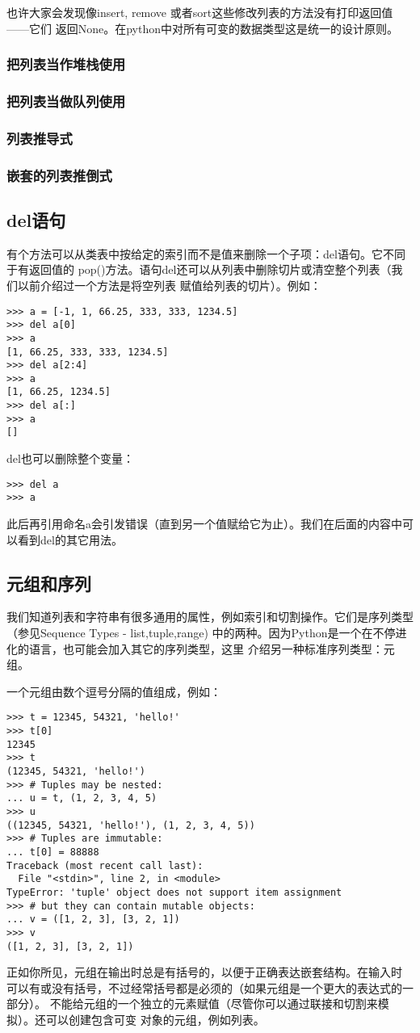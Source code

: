 \documentclass[UTF8]{ctexart}
\begin{document}
也许大家会发现像insert, remove 或者sort这些修改列表的方法没有打印返回值——它们
返回None。在python中对所有可变的数据类型这是统一的设计原则。
\subsubsection{把列表当作堆栈使用}
\subsubsection{把列表当做队列使用}
\subsubsection{列表推导式}
\subsubsection{嵌套的列表推倒式}
\subsection{del语句}
有个方法可以从类表中按给定的索引而不是值来删除一个子项：del语句。它不同于有返回值的
pop()方法。语句del还可以从列表中删除切片或清空整个列表（我们以前介绍过一个方法是将空列表
赋值给列表的切片）。例如：
\begin{verbatim}
>>> a = [-1, 1, 66.25, 333, 333, 1234.5]
>>> del a[0]
>>> a
[1, 66.25, 333, 333, 1234.5]
>>> del a[2:4]
>>> a
[1, 66.25, 1234.5]
>>> del a[:]
>>> a
[]
\end{verbatim}

del也可以删除整个变量：
\begin{verbatim}
>>> del a
>>> a
\end{verbatim}

此后再引用命名a会引发错误（直到另一个值赋给它为止）。我们在后面的内容中可以看到del的其它用法。
\subsection{元组和序列}
我们知道列表和字符串有很多通用的属性，例如索引和切割操作。它们是序列类型（参见Sequence Types -
list,tuple,range) 中的两种。因为Python是一个在不停进化的语言，也可能会加入其它的序列类型，这里
介绍另一种标准序列类型：元组。

一个元组由数个逗号分隔的值组成，例如：
\begin{verbatim}
>>> t = 12345, 54321, 'hello!'
>>> t[0]
12345
>>> t
(12345, 54321, 'hello!')
>>> # Tuples may be nested:
... u = t, (1, 2, 3, 4, 5)
>>> u
((12345, 54321, 'hello!'), (1, 2, 3, 4, 5))
>>> # Tuples are immutable:
... t[0] = 88888
Traceback (most recent call last):
  File "<stdin>", line 2, in <module>
TypeError: 'tuple' object does not support item assignment
>>> # but they can contain mutable objects:
... v = ([1, 2, 3], [3, 2, 1])
>>> v
([1, 2, 3], [3, 2, 1])
\end{verbatim}
正如你所见，元组在输出时总是有括号的，以便于正确表达嵌套结构。在输入时
可以有或没有括号，不过经常括号都是必须的（如果元组是一个更大的表达式的一部分）。
不能给元组的一个独立的元素赋值（尽管你可以通过联接和切割来模拟）。还可以创建包含可变
对象的元组，例如列表。
\end{document}
